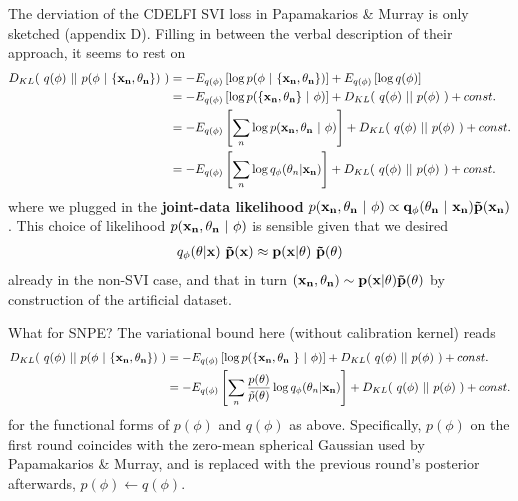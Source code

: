 \documentclass[10pt,english]{article}
\begin{document}
The derviation of the CDELFI SVI loss in Papamakarios \& Murray is only sketched (appendix D). 
Filling in between the verbal description of their approach, it seems to rest on 
\begin{align}
D_{KL}( \ q(\phi) \ || \ p(\phi \ | \ \{\bf{x}_n, \theta_n\}) \ ) &= - E_{q(\phi)}\left[ \log p(\phi \ | \ \{\bf{x}_n, \theta_n\}) \right]  + E_{q(\phi)}\left[ \log q(\phi) \right] \nonumber \\
&= - E_{q(\phi)}\left[ \log p( \{\bf{x}_n, \theta_n\} \ | \ \phi) \right]  + D_{KL}( \ q(\phi) \ || \ p(\phi) \ )  + const. \nonumber \\
&= - E_{q(\phi)}\left[ \sum_n \log p( \bf{x}_n, \theta_n \ | \ \phi) \right]  + D_{KL}( \ q(\phi) \ || \ p(\phi) \ )  + const. \nonumber \\
&= - E_{q(\phi)}\left[ \sum_n \log q_\phi( \theta_n | \bf{x}_n) \right]  + D_{KL}( \ q(\phi) \ || \ p(\phi) \ )  + const. \nonumber
\end{align}
where we plugged in the \textbf{joint-data likelihood} $p( \bf{x}_n, \theta_n \ | \ \phi) \propto q_\phi(\theta_n \ | \ \bf{x}_n) \tilde{p}(\bf{x}_n)$. 
This choice of likelihood $p( \bf{x}_n, \theta_n \ | \ \phi)$ is sensible given that we desired
\begin{align}
q_\phi(\theta | \bf{x}) \ \tilde{p}(\bf{x}) \approx p(x |\theta) \ \tilde{p}(\theta) \nonumber
\end{align}
already in the non-SVI case, and that in turn $(\bf{x}_n, \theta_n) \sim p(x|\theta)\tilde{p}(\theta)$ by construction of the artificial dataset.



\noindent{}What for SNPE? The variational bound here (without calibration kernel) reads 
\begin{align}
D_{KL}( \ q(\phi) \ || \ p(\phi \ | \ \{\bf{x}_n, \theta_n\}) \ ) &= - E_{q(\phi)}\left[ \log p( \{ \bf{x}_n, \theta_n \ \} \ | \ \phi) \right]  + D_{KL}( \ q(\phi) \ || \ p(\phi) \ )  + const. \nonumber \\
&= - E_{q(\phi)}\left[ \sum_n \frac{p(\theta)}{\tilde{p}(\theta)}\log q_\phi( \theta_n | \bf{x}_n) \right]  + D_{KL}( \ q(\phi) \ || \ p(\phi) \ )  + const. \nonumber
\end{align}
for the functional forms of $p(\phi)$ and $q(\phi)$ as above.
Specifically, $p(\phi)$ on the first round coincides with the zero-mean spherical Gaussian used by Papamakarios \& Murray, and is replaced with the previous round's posterior afterwards, $p(\phi) \leftarrow q(\phi)$.
\end{document}
